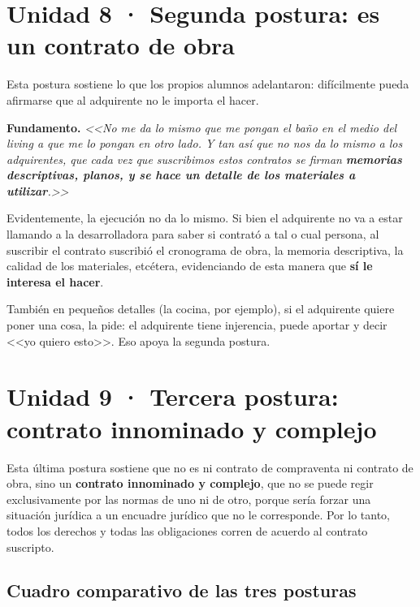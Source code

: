 \documentclass[12pt,oneside]{book}
\begin{document}
\section{Unidad 8 · Segunda postura: es un contrato de obra}

Esta postura sostiene lo que los propios alumnos adelantaron: difícilmente pueda afirmarse que al adquirente no le importa el hacer.

\textbf{Fundamento.} \textit{<<No me da lo mismo que me pongan el baño en el medio del living a que me lo pongan en otro lado. Y tan así que no nos da lo mismo a los adquirentes, que cada vez que suscribimos estos contratos se firman} \textbf{\textit{memorias descriptivas, planos, y se hace un detalle de los materiales a utilizar}}\textit{.>>}

Evidentemente, la ejecución no da lo mismo. Si bien el adquirente no va a estar llamando a la desarrolladora para saber si contrató a tal o cual persona, al suscribir el contrato suscribió el cronograma de obra, la memoria descriptiva, la calidad de los materiales, etcétera, evidenciando de esta manera que \textbf{sí le interesa el hacer}.

También en pequeños detalles (la cocina, por ejemplo), si el adquirente quiere poner una cosa, la pide: el adquirente tiene injerencia, puede aportar y decir <<yo quiero esto>>. Eso apoya la segunda postura.

\section{Unidad 9 · Tercera postura: contrato innominado y complejo}

Esta última postura sostiene que no es ni contrato de compraventa ni contrato de obra, sino un \textbf{contrato innominado y complejo}, que no se puede regir exclusivamente por las normas de uno ni de otro, porque sería forzar una situación jurídica a un encuadre jurídico que no le corresponde. Por lo tanto, todos los derechos y todas las obligaciones corren de acuerdo al contrato suscripto.


\subsection{Cuadro comparativo de las tres posturas}
\end{document}
